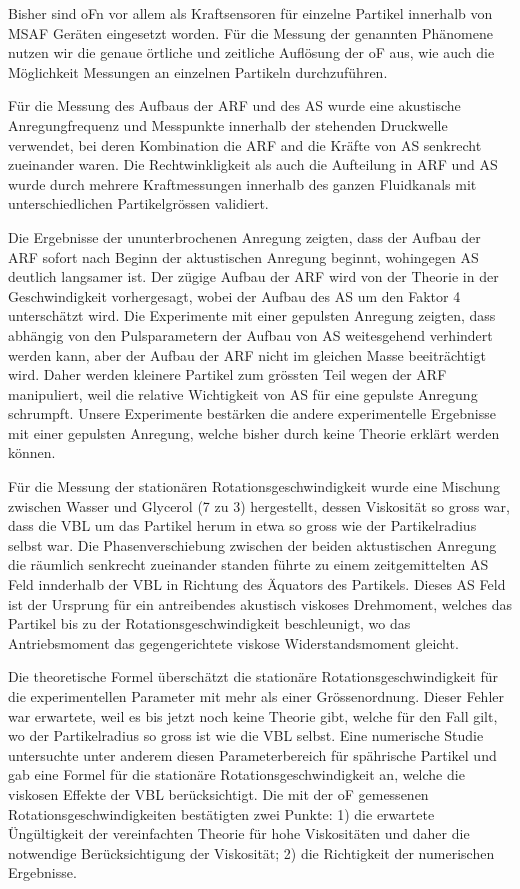Bisher sind oFn vor allem als Kraftsensoren für einzelne Partikel innerhalb von 
MSAF Geräten eingesetzt worden. Für die Messung der genannten Phänomene nutzen 
wir die genaue örtliche und zeitliche Auflösung der oF aus, wie auch die 
Möglichkeit Messungen an einzelnen Partikeln durchzuführen.

Für die Messung des Aufbaus der ARF und des AS wurde eine akustische 
Anregungfrequenz und Messpunkte innerhalb der stehenden Druckwelle verwendet, 
bei deren Kombination die ARF and die Kräfte von AS senkrecht zueinander waren.  
Die Rechtwinkligkeit als auch die Aufteilung in ARF und AS wurde durch mehrere 
Kraftmessungen innerhalb des ganzen Fluidkanals mit unterschiedlichen 
Partikelgrössen validiert.

Die Ergebnisse der ununterbrochenen Anregung zeigten, dass der Aufbau der ARF 
sofort nach Beginn der aktustischen Anregung beginnt, wohingegen AS deutlich 
langsamer ist. Der zügige Aufbau der ARF wird von der Theorie in der 
Geschwindigkeit vorhergesagt, wobei der Aufbau des AS um den Faktor 4 
unterschätzt wird. Die Experimente mit einer gepulsten Anregung zeigten, dass 
abhängig von den Pulsparametern der Aufbau von AS weitesgehend verhindert 
werden kann, aber der Aufbau der ARF nicht im gleichen Masse beeiträchtigt 
wird. Daher werden kleinere Partikel zum grössten Teil wegen der ARF 
manipuliert, weil die relative Wichtigkeit von AS für eine gepulste Anregung 
schrumpft. Unsere Experimente bestärken die andere experimentelle Ergebnisse 
mit einer gepulsten Anregung, welche bisher durch keine Theorie erklärt werden 
können.

Für die Messung der stationären Rotationsgeschwindigkeit wurde eine Mischung 
zwischen Wasser und Glycerol (7 zu 3) hergestellt, dessen Viskosität so gross 
war, dass die VBL um das Partikel herum in etwa so gross wie der Partikelradius 
selbst war. Die Phasenverschiebung zwischen der beiden aktustischen Anregung 
die räumlich senkrecht zueinander standen führte zu einem zeitgemittelten AS 
Feld innderhalb der VBL in Richtung des Äquators des Partikels. Dieses AS Feld 
ist der Ursprung für ein antreibendes akustisch viskoses Drehmoment, welches 
das Partikel bis zu der Rotationsgeschwindigkeit beschleunigt, wo das 
Antriebsmoment das gegengerichtete viskose Widerstandsmoment gleicht.

Die theoretische Formel überschätzt die stationäre Rotationsgeschwindigkeit für 
die experimentellen Parameter mit mehr als einer Grössenordnung. Dieser Fehler 
war erwartete, weil es bis jetzt noch keine Theorie gibt, welche für den Fall 
gilt, wo der Partikelradius so gross ist wie die VBL selbst. Eine numerische 
Studie untersuchte unter anderem diesen Parameterbereich für spährische 
Partikel und gab eine Formel für die stationäre Rotationsgeschwindigkeit an, 
welche die viskosen Effekte der VBL berücksichtigt. Die mit der oF gemessenen 
Rotationsgeschwindigkeiten bestätigten zwei Punkte: 1) die erwartete 
Üngültigkeit der vereinfachten Theorie für hohe Viskositäten und daher die 
notwendige Berücksichtigung der Viskosität; 2) die Richtigkeit der numerischen 
Ergebnisse.
